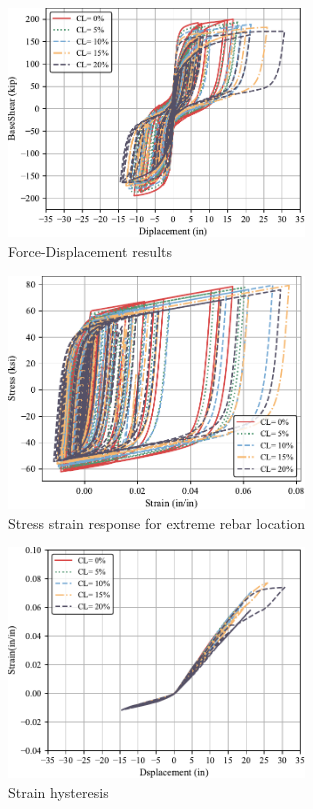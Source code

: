 \begin{figure}[htbp]
	\centering
	\includegraphics[width=0.7\textwidth]{Chapter-5/figs/Force_Diplacement_RSN1505.pdf}
	\caption{Force-Displacement results}
	\label{fig:Force-Displacement_Results}
\end{figure}

\begin{figure}[htbp]
	\centering
	\includegraphics[width=0.7\textwidth]{Chapter-5/figs/Stress_Strain_RSN1505.pdf}
	\caption{Stress strain response for extreme rebar location}
	\label{fig:Steel_Stress_Strain_Response}
\end{figure}

\begin{figure}[htbp]
	\centering
	\includegraphics[width=0.7\textwidth]{Chapter-5/figs/Diplacement_Strain_RSN1505.pdf}
	\caption{Strain hysteresis}
	\label{fig:Steel_Strain_Response}
\end{figure}

